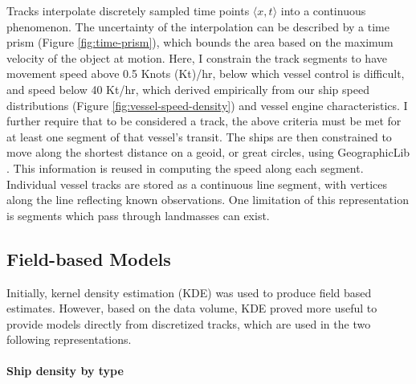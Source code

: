 Tracks interpolate discretely sampled time points $\langle x, t \rangle$ into a continuous phenomenon. The uncertainty of the interpolation can be described by a time prism (Figure \ref{fig:time-prism}), which bounds the area based on the maximum velocity of the object at motion. Here, I constrain the track segments to have movement speed above 0.5 Knots (Kt)/hr, below which vessel control is difficult, and speed below 40 Kt/hr, which derived empirically from our ship speed distributions (Figure \ref{fig:vessel-speed-density}) and vessel engine characteristics.  I further require that to be considered a track, the above criteria must be met for at least one segment of that vessel's transit. The ships are then constrained to move along the shortest distance on a geoid, or great circles, using GeographicLib \citep{karney2012algorithms}. This information is reused in computing the speed along each segment. %
Individual vessel tracks are stored as a continuous line segment, with vertices along the line reflecting known observations. One limitation of this representation is segments which pass through landmasses can exist.


\subsection{Field-based Models}

Initially, kernel density estimation (KDE) was used to produce field based estimates. However, based on the data volume, KDE proved more useful to provide models directly from discretized tracks, which are used in the two following representations.

\paragraph{Ship density by type}

